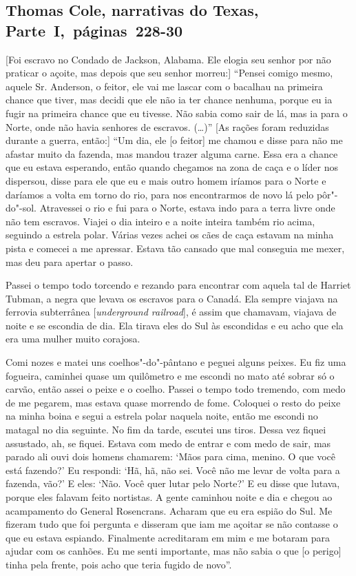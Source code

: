 \subsection{Thomas Cole, narrativas do Texas, Parte~I,~páginas~228-30} \label{ref57}

{[}Foi escravo no Condado de Jackson, Alabama. Ele elogia seu senhor por não praticar o açoite, mas depois que seu
senhor morreu:{]} ``Pensei comigo mesmo, aquele Sr. Anderson, o feitor,
ele vai me lascar com o bacalhau na primeira chance que tiver, mas
decidi que ele não ia ter chance nenhuma, porque eu ia fugir na primeira
chance que eu tivesse. Não sabia como sair de lá, mas ia para o Norte,
onde não havia senhores de escravos. (\ldots{})'' {[}As rações foram
reduzidas durante a guerra, então:{]} ``Um dia, ele {[}o feitor{]} me
chamou e disse para não me afastar muito da fazenda, mas mandou trazer
alguma carne. Essa era a chance que eu estava esperando, então quando
chegamos na zona de caça e o líder nos dispersou, disse para ele que eu
e mais outro homem iríamos para o Norte e daríamos a volta em torno do
rio, para nos encontrarmos de novo lá pelo pôr"-do"-sol. Atravessei o rio
e fui para o Norte, estava indo para a terra livre onde não tem
escravos. Viajei o dia inteiro e a noite inteira também rio acima,
seguindo a estrela polar. Várias vezes achei os cães de caça estavam na %
minha pista e comecei a me apressar. Estava tão cansado que mal
conseguia me mexer, mas deu para apertar o passo.

Passei o tempo todo torcendo e rezando para encontrar com aquela tal de
Harriet Tubman, a negra que levava os escravos para o Canadá. Ela sempre
viajava na ferrovia subterrânea {[}\emph{underground railroad}{]}, é assim que
chamavam, viajava de noite e se escondia de dia. Ela tirava eles do Sul
às escondidas e eu acho que ela era uma mulher muito corajosa.

Comi nozes e matei uns coelhos"-do"-pântano e peguei alguns peixes. Eu fiz
uma fogueira, caminhei quase um quilômetro e me escondi no mato até
sobrar só o carvão, então assei o peixe e o coelho. Passei o tempo todo
tremendo, com medo de me pegarem, mas estava quase morrendo de fome.
Coloquei o resto do peixe na minha boina e segui a estrela polar naquela
noite, então me escondi no matagal no dia seguinte. No fim da tarde,
escutei uns tiros. Dessa vez fiquei assustado, ah, se fiquei. Estava com
medo de entrar e com medo de sair, mas parado ali ouvi dois homens
chamarem: `Mãos para cima, menino. O que você está fazendo?' Eu
respondi: `Hã, hã, não sei. Você não me levar de volta para a fazenda, %
vão?' E eles: `Não. Você quer lutar pelo Norte?' E eu disse que lutava,
porque eles falavam feito nortistas. A gente caminhou noite e dia e
chegou ao acampamento do General Rosencrans. Acharam que eu era espião
do Sul. Me fizeram tudo que foi pergunta e disseram que iam me açoitar
se não contasse o que eu estava espiando. Finalmente acreditaram em mim
e me botaram para ajudar com os canhões. Eu me senti importante, mas não
sabia o que {[}o perigo{]} tinha pela frente, pois acho que teria fugido
de novo''.

